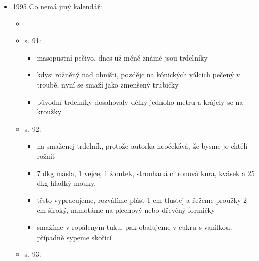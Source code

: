 \begin{itemize}
\begin{itemize}
    \begin{itemize}
    \tightlist
    \item
      povídka \emph{Polární zář}
    \item
      dodraná, vypravějí se různý historky a zážitky vesničanů
    \item
      Jožka se hodně najedl jelit a dalších jídel, takže už nemůže. Ale
      povolí si opasek a spořádá celý trdelník.
    \end{itemize}
  \item
    s. 93:

    \begin{itemize}
    \tightlist
    \item
      slovníček. trdelník = nadívaná trubička
    \end{itemize}
  \end{itemize}
\item
  1995
  \href{https://www.digitalniknihovna.cz/mzk/uuid/uuid:0be735a0-e849-11ea-804d-005056827e51}{Co
  nemá jiný kalendář}:

  \begin{itemize}
  \tightlist
  \item
  \item
    s. 91:

    \begin{itemize}
    \tightlist
    \item
      masopustní pečivo, dnes už méně známé jsou trdelníky
    \item
      kdysi rožněný nad ohništi, pozdějc na kónických válcích pečený v
      troubě, nyní se smaží jako zmenšený trubičky
    \item
      původní trdelníky dosahovaly délky jednoho metru a krájely se na
      kroužky
    \end{itemize}
  \item
    s. 92:

    \begin{itemize}
    \tightlist
    \item
       na smaženej trdelník, protože autorka neočekává,
      že bysme je chtěli rožnit
    \item
      7 dkg másla, 1 vejce, 1 žloutek, strouhaná citronová kůra, kvásek
      a 25 dkg hladký mouky.
    \item
      těsto vypracujeme, rozválíme plást 1 cm tlustej a řežeme proužky 2
      cm široký, namotáme na plechový nebo dřevěný formičky
    \item
      smažíme v ropálenym tuku, pak obalujeme v cukru s vanilkou,
      případně sypeme skořicí
    \end{itemize}
  \item
    s. 93:


\end{itemize}
\end{itemize}
